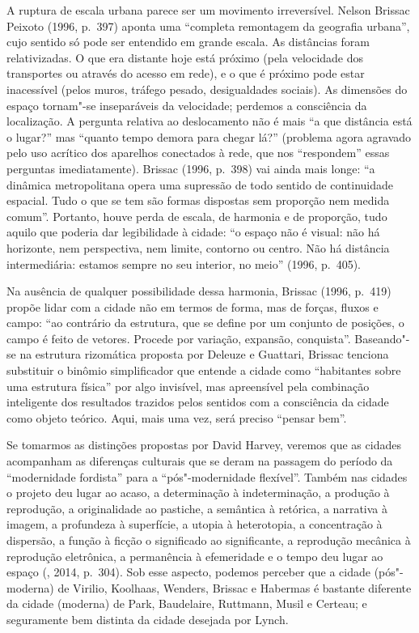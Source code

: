 A ruptura de escala urbana parece ser um movimento irreversível. Nelson
Brissac Peixoto (1996, p.~397) aponta uma ``completa remontagem da
geografia urbana'', cujo sentido só pode ser entendido em grande escala.
As distâncias foram relativizadas. O que era distante hoje está próximo
(pela velocidade dos transportes ou através do acesso em rede), e o que
é próximo pode estar inacessível (pelos muros, tráfego pesado,
desigualdades sociais). As dimensões do espaço tornam"-se inseparáveis da
velocidade; perdemos a consciência da localização. A pergunta relativa
ao deslocamento não é mais ``a que distância está o lugar?'' mas
``quanto tempo demora para chegar lá?'' (problema agora agravado pelo
uso acrítico dos aparelhos conectados à rede, que nos ``respondem''
essas perguntas imediatamente). Brissac (1996, p.~398) vai ainda mais longe: ``a
dinâmica metropolitana opera uma supressão de todo sentido de
continuidade espacial. Tudo o que se tem são formas dispostas sem
proporção nem medida comum''. Portanto, houve perda de
escala, de harmonia e de proporção, tudo aquilo que poderia dar
legibilidade à cidade: ``o espaço não é visual: não há horizonte, nem
perspectiva, nem limite, contorno ou centro. Não há distância
intermediária: estamos sempre no seu interior, no meio'' (1996, p.~405).

Na ausência de qualquer possibilidade dessa harmonia, Brissac (1996,
p.~419) propõe lidar com a cidade não em termos de forma, mas de forças,
fluxos e campo: ``ao contrário da estrutura, que se define por um
conjunto de posições, o campo é feito de vetores. Procede por variação,
expansão, conquista''. Baseando"-se na estrutura rizomática proposta por
Deleuze e Guattari, Brissac tenciona substituir o binômio
simplificador que entende a cidade como ``habitantes sobre uma estrutura
física'' por algo invisível, mas apreensível pela combinação inteligente
dos resultados trazidos pelos sentidos com a consciência da cidade como
objeto teórico. Aqui, mais uma vez, será preciso ``pensar bem''.

Se tomarmos as distinções propostas por David Harvey, veremos que as
cidades acompanham as diferenças culturais que se deram na passagem do
período da ``modernidade fordista'' para a ``pós"-modernidade flexível''.
Também nas cidades o projeto deu lugar ao acaso, a determinação à
indeterminação, a produção à reprodução, a originalidade ao pastiche, a
semântica à retórica, a narrativa à imagem, a profundeza à superfície, a
utopia à heterotopia, a concentração à dispersão, a função à ficção o
significado ao significante, a reprodução mecânica à reprodução
eletrônica, a permanência à efemeridade e o tempo deu lugar ao espaço
(, 2014, p.~304). Sob esse aspecto, podemos perceber que a cidade
(pós"-moderna) de Virilio, Koolhaas, Wenders, Brissac e Habermas
é bastante diferente da cidade (moderna) de Park, Baudelaire, Ruttmann,
Musil e Certeau; e seguramente bem distinta da cidade desejada por
Lynch.

